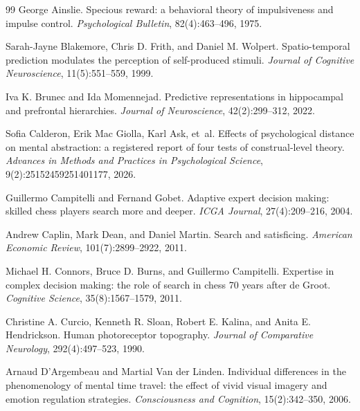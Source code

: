 \documentclass[11pt,a4paper]{article}
\theoremstyle{remark}
\begin{document}
\begin{thebibliography}{99}
\sloppy
{}
George Ainslie.
\newblock Specious reward: a behavioral theory of impulsiveness and impulse control.
\newblock \emph{Psychological Bulletin}, 82(4):463--496, 1975.

Sarah-Jayne Blakemore, Chris D. Frith, and Daniel M. Wolpert.
\newblock Spatio-temporal prediction modulates the perception of self-produced stimuli.
\newblock \emph{Journal of Cognitive Neuroscience}, \mbox{11(5):551--559}, 1999.

Iva K. Brunec and Ida Momennejad.
\newblock Predictive representations in hippocampal and prefrontal hierarchies.
\newblock \emph{Journal of Neuroscience}, 42(2):299--312, 2022.

Sofia Calderon, Erik Mac Giolla, Karl Ask, et~al.
\newblock Effects of psychological distance on mental abstraction: a registered report of four tests of construal-level theory.
\newblock \emph{Advances in Methods and Practices in Psychological Science}, 9(2):25152459251401177, 2026.

Guillermo Campitelli and Fernand Gobet.
\newblock Adaptive expert decision making: skilled chess players search more and deeper.
\newblock \emph{ICGA Journal}, 27(4):209--216, 2004.

Andrew Caplin, Mark Dean, and Daniel Martin.
\newblock Search and satisficing.
\newblock \emph{American Economic Review}, 101(7):2899--2922, 2011.

Michael H. Connors, Bruce D. Burns, and Guillermo Campitelli.
\newblock Expertise in complex decision making: the role of search in chess 70 years after de Groot.
\newblock \emph{Cognitive Science}, 35(8):1567--1579, 2011.

Christine A. Curcio, Kenneth R. Sloan, Robert E. Kalina, and Anita E. Hendrickson.
\newblock Human photoreceptor topography.
\newblock \emph{Journal of Comparative Neurology}, 292(4):497--523, 1990.

Arnaud D'Argembeau and Martial Van der Linden.
\newblock Individual differences in the phenomenology of mental time travel: the effect of vivid visual imagery and emotion regulation strategies.
\newblock \emph{Consciousness and Cognition}, 15(2):342--350, 2006.


\end{thebibliography}
\end{document}
